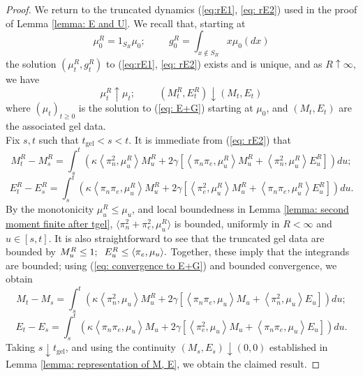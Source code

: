 \begin{proof} We return to the truncated dynamics (\ref{eq:rE1}, \ref{eq: rE2}) used in the proof of Lemma \ref{lemma: E and U}. We recall that, starting at \begin{equation} \mu^R_0 = 1_{S_R}\mu_0; \hspace{1cm} g^R_0=\int_{x\not\in S_R} x\mu_0(dx)\end{equation} the solution $(\mu^R_t, g^R_t)$ to (\ref{eq:rE1}, \ref{eq: rE2}) exists and is unique, and as $R\uparrow \infty$, we have \begin{equation} \label{eq: convergence to E+G}
    \mu^R_t\uparrow \mu_t; \hspace{1cm} (M^R_t, E^R_t)\downarrow (M_t, E_t)
\end{equation} where $(\mu_t)_{t\ge 0}$ is the solution to (\ref{eq: E+G}) starting at $\mu_0$, and $(M_t, E_t)$ are the associated gel data. \medskip \\ Fix $s, t$ such that $t_\mathrm{gel}<s<t$. It is immediate from (\ref{eq: rE2}) that \begin{equation}
    M^R_t-M^R_s=\int_{s}^t 
    \left(
      \kappa \left<\pi_n^2,\mu^R_u\right>M^R_u +
      2\gamma \left[
        \left<\pi_n \pi_e,\mu^R_u \right>M^R_u +
        \left<\pi_n^2,\mu^R_u \right>E^R_u \right]
    \right)du;
\end{equation}
\begin{equation}
    E^R_t-E^R_s=\int_{s}^t 
    \left(
      \kappa \left<\pi_n \pi_e,\mu^R_u\right>M^R_u +
      2\gamma \left[
        \left<\pi_e^2,\mu^R_u \right>M^R_u +
        \left<\pi_n \pi_e,\mu^R_u \right>E^R_u \right]
    \right)du.
\end{equation} By the monotonicity $\mu^R_u \le \mu_u$, and local boundedness in Lemma \ref{lemma: second moment finite after tgel},  $\langle \pi_n^2+ \pi_e^2, \mu^R_u\rangle $ is bounded, uniformly in $R<\infty$ and $u\in [s,t]$. It is also  straightforward to see that the truncated gel data are bounded by $M^R_u \le 1;\hspace{0.2cm} E^R_u \le \langle \pi_e, \mu_u\rangle.$ Together, these imply that the integrands are bounded; using (\ref{eq: convergence to E+G}) and bounded convergence, we obtain  \begin{equation}
    M_t-M_s=\int_{s}^t 
    \left(
      \kappa \left<\pi_n^2,\mu_u\right>M^R_u +
      2\gamma \left[
        \left<\pi_n \pi_e,\mu_u \right>M_u +
        \left<\pi_n^2,\mu_u \right>E_u \right]
    \right)du;
\end{equation}
\begin{equation}
    E_t-E_s=\int_{s}^t 
    \left(
      \kappa \left<\pi_n \pi_e,\mu_u\right>M_u +
      2\gamma \left[
        \left<\pi_e^2,\mu_u \right>M_u +
        \left<\pi_n \pi_e,\mu_u \right>E_u \right]
    \right)du.
\end{equation} Taking $s\downarrow t_\mathrm{gel}$, and using the continuity $(M_s, E_s)\downarrow (0,0)$ established in Lemma \ref{lemma: representation of M, E}, we obtain the claimed result. \end{proof}